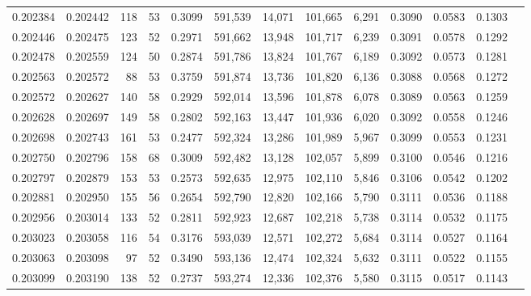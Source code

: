 \begin{tabular}{rrrrrrrrrrrrr}
0.202384 & 0.202442 &   118 &  53 &                                     0.3099 & 591,539 &  14,071 & 101,665 &   6,291 & 0.3090 & 0.0583 & 0.1303 \\
0.202446 & 0.202475 &   123 &  52 &                                     0.2971 & 591,662 &  13,948 & 101,717 &   6,239 & 0.3091 & 0.0578 & 0.1292 \\
0.202478 & 0.202559 &   124 &  50 &                                     0.2874 & 591,786 &  13,824 & 101,767 &   6,189 & 0.3092 & 0.0573 & 0.1281 \\
0.202563 & 0.202572 &    88 &  53 &                                     0.3759 & 591,874 &  13,736 & 101,820 &   6,136 & 0.3088 & 0.0568 & 0.1272 \\
0.202572 & 0.202627 &   140 &  58 &                                     0.2929 & 592,014 &  13,596 & 101,878 &   6,078 & 0.3089 & 0.0563 & 0.1259 \\
0.202628 & 0.202697 &   149 &  58 &                                     0.2802 & 592,163 &  13,447 & 101,936 &   6,020 & 0.3092 & 0.0558 & 0.1246 \\
0.202698 & 0.202743 &   161 &  53 &                                     0.2477 & 592,324 &  13,286 & 101,989 &   5,967 & 0.3099 & 0.0553 & 0.1231 \\
0.202750 & 0.202796 &   158 &  68 &                                     0.3009 & 592,482 &  13,128 & 102,057 &   5,899 & 0.3100 & 0.0546 & 0.1216 \\
0.202797 & 0.202879 &   153 &  53 &                                     0.2573 & 592,635 &  12,975 & 102,110 &   5,846 & 0.3106 & 0.0542 & 0.1202 \\
0.202881 & 0.202950 &   155 &  56 &                                     0.2654 & 592,790 &  12,820 & 102,166 &   5,790 & 0.3111 & 0.0536 & 0.1188 \\
0.202956 & 0.203014 &   133 &  52 &                                     0.2811 & 592,923 &  12,687 & 102,218 &   5,738 & 0.3114 & 0.0532 & 0.1175 \\
0.203023 & 0.203058 &   116 &  54 &                                     0.3176 & 593,039 &  12,571 & 102,272 &   5,684 & 0.3114 & 0.0527 & 0.1164 \\
0.203063 & 0.203098 &    97 &  52 &                                     0.3490 & 593,136 &  12,474 & 102,324 &   5,632 & 0.3111 & 0.0522 & 0.1155 \\
0.203099 & 0.203190 &   138 &  52 &                                     0.2737 & 593,274 &  12,336 & 102,376 &   5,580 & 0.3115 & 0.0517 & 0.1143 \\

\end{tabular}
